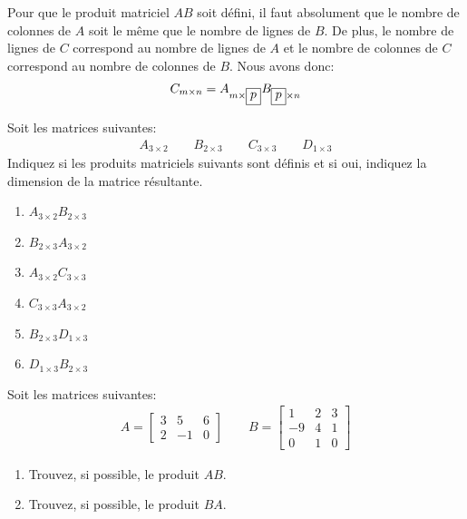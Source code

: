 \documentclass[]{book}
\providecommand{\tightlist}{%
  \setlength{\itemsep}{0pt}\setlength{\parskip}{0pt}}
\theoremstyle{definition}
\theoremstyle{definition}
\theoremstyle{definition}
\theoremstyle{remark}
\let\BeginKnitrBlock\begin \let\EndKnitrBlock\end
\begin{document}
\BeginKnitrBlock{remark}
{}Pour que le produit matriciel \(AB\) soit défini, il faut absolument que le nombre de colonnes de \(A\) soit le même que le nombre de lignes de \(B\). De plus, le nombre de lignes de \(C\) correspond au nombre de lignes de \(A\) et le nombre de colonnes de \(C\) correspond au nombre de colonnes de \(B\). Nous avons donc:
\begin{align*}
C_{m\times n} = A_{m\times \fbox{$p$}}B_{\fbox{$p$} \times n}
\end{align*}
\EndKnitrBlock{remark}

\BeginKnitrBlock{example}
\protect\hypertarget{exm:unnamed-chunk-62}{}{\label{exm:unnamed-chunk-62} }Soit les matrices suivantes:
\begin{align*}
A_{3\times 2} \qquad B_{2\times 3} \qquad C_{3\times 3} \qquad D_{1\times 3}
\end{align*}
Indiquez si les produits matriciels suivants sont définis et si oui, indiquez la dimension de la matrice résultante.

\begin{enumerate}
\def\labelenumi{\alph{enumi}.}
\tightlist
\item
  \(A_{3\times 2}B_{2\times 3}\)
\item
  \(B_{2\times 3}A_{3\times 2}\)
\item
  \(A_{3\times 2}C_{3\times 3}\)
\item
  \(C_{3\times 3}A_{3\times 2}\)
\item
  \(B_{2\times 3}D_{1\times 3}\)
\item
  \(D_{1\times 3}B_{2\times 3}\)
\end{enumerate}
\EndKnitrBlock{example}

\BeginKnitrBlock{example}
\protect\hypertarget{exm:unnamed-chunk-63}{}{\label{exm:unnamed-chunk-63} }Soit les matrices suivantes:
\begin{align*}
A=\begin{bmatrix}
3 & 5 & 6 \\
2 & -1 & 0
\end{bmatrix}
\qquad 
B=\begin{bmatrix}
1 & 2 & 3 \\
-9 & 4 & 1 \\
0 & 1 & 0
\end{bmatrix}
\end{align*}

\begin{enumerate}
\def\labelenumi{\alph{enumi}.}
\tightlist
\item
  Trouvez, si possible, le produit \(AB\).
\item
  Trouvez, si possible, le produit \(BA\).
\end{enumerate}
\EndKnitrBlock{example}
\end{document}
